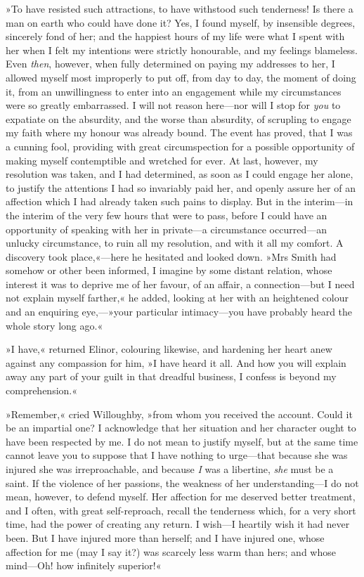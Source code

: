 »To have resisted such attractions, to have withstood such tenderness! Is there a man on earth who could have done it? Yes, I found myself, by insensible degrees, sincerely fond of her; and the happiest hours of my life were what I spent with her when I felt my intentions were strictly honourable, and my feelings blameless. Even \textit{then}, however, when fully determined on paying my addresses to her, I allowed myself most improperly to put off, from day to day, the moment of doing it, from an unwillingness to enter into an engagement while my circumstances were so greatly embarrassed. I will not reason here—nor will I stop for \textit{you} to expatiate on the absurdity, and the worse than absurdity, of scrupling to engage my faith where my honour was already bound. The event has proved, that I was a cunning fool, providing with great circumspection for a possible opportunity of making myself contemptible and wretched for ever. At last, however, my resolution was taken, and I had determined, as soon as I could engage her alone, to justify the attentions I had so invariably paid her, and openly assure her of an affection which I had already taken such pains to display. But in the interim—in the interim of the very few hours that were to pass, before I could have an opportunity of speaking with her in private—a circumstance occurred—an unlucky circumstance, to ruin all my resolution, and with it all my comfort. A discovery took place,«—here he hesitated and looked down. »Mrs Smith had somehow or other been informed, I imagine by some distant relation, whose interest it was to deprive me of her favour, of an affair, a connection—but I need not explain myself farther,« he added, looking at her with an heightened colour and an enquiring eye,—»your particular intimacy—you have probably heard the whole story long ago.«

»I have,« returned Elinor, colouring likewise, and hardening her heart anew against any compassion for him, »I have heard it all. And how you will explain away any part of your guilt in that dreadful business, I confess is beyond my comprehension.«

»Remember,« cried Willoughby, »from whom you received the account. Could it be an impartial one? I acknowledge that her situation and her character ought to have been respected by me. I do not mean to justify myself, but at the same time cannot leave you to suppose that I have nothing to urge—that because she was injured she was irreproachable, and because \textit{I} was a libertine, \textit{she} must be a saint. If the violence of her passions, the weakness of her understanding—I do not mean, however, to defend myself. Her affection for me deserved better treatment, and I often, with great self-reproach, recall the tenderness which, for a very short time, had the power of creating any return. I wish—I heartily wish it had never been. But I have injured more than herself; and I have injured one, whose affection for me (may I say it?) was scarcely less warm than hers; and whose mind—Oh! how infinitely superior!«

